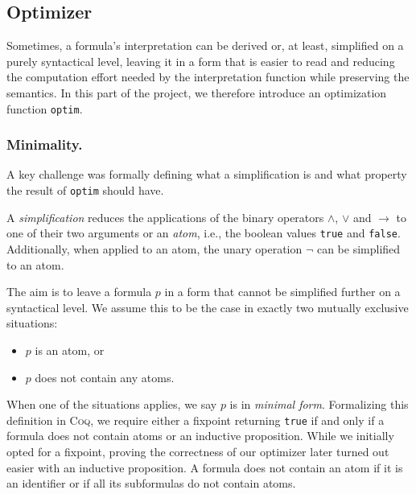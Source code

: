 \subsection{Optimizer}

Sometimes, a formula's interpretation can be derived or, at least, simplified on a purely syntactical level, leaving it in a form that is easier to read and reducing the computation effort needed by the interpretation function while preserving the semantics.
In this part of the project, we therefore introduce an optimization function \texttt{optim}.

\subsubsection{Minimality.}

A key challenge was formally defining what a simplification is and what property the result of \texttt{optim} should have.

A \emph{simplification} reduces the applications of the binary operators $\land$, $\lor$ and $\rightarrow$ to one of their two arguments or an \emph{atom}, i.e., the boolean values \texttt{true} and \texttt{false}. 
Additionally, when applied to an atom, the unary operation $\neg$ can be simplified to an atom.

The aim is to leave a formula $p$ in a form that cannot be simplified further on a syntactical level.
We assume this to be the case in exactly two mutually exclusive situations:
\begin{itemize}
    \item $p$ is an atom, or
    \item $p$ does not contain any atoms.
\end{itemize}
When one of the situations applies, we say $p$ is in \emph{minimal form}. Formalizing this definition in \textsc{Coq}, we require either a fixpoint returning \texttt{true} if and only if a formula does not contain atoms or an inductive proposition.
While we initially opted for a fixpoint, proving the correctness of our optimizer later turned out easier with an inductive proposition. 
A formula does not contain an atom if it is an identifier or if all its subformulas do not contain atoms.

